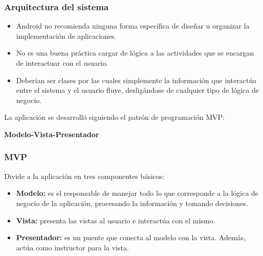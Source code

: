 \begin{frame}[t,fragile]
\frametitle {Arquitectura del sistema}
\begin{itemize}
	\item Android no recomienda ninguna forma específica de diseñar u organizar la implementación de aplicaciones.
	\item No es una buena práctica cargar de lógica a las actividades que se encargan de interactuar	con el usuario.
	\item Deberían ser clases por las cuales simplemente la información que interactúa entre el sistema y el usuario fluye, desligándose de cualquier tipo de lógica de negocio.
\end{itemize}

\vspace{5mm}

La aplicación se desarrolló siguiendo el patrón de programación MVP: 

\begin{center}
	\textbf{Modelo-Vista-Presentador}
\end{center} 

\end{frame}	
\begin{frame}[t,fragile]
\frametitle {MVP}

Divide a la aplicación en tres componentes básicos:

\begin{itemize}
	\item \textbf{Modelo:} es el responsable de manejar todo lo que corresponde a la lógica de negocio de la aplicación, procesando la información y tomando decisiones.
	\vspace{3mm}
	\item \textbf{Vista:} presenta las vistas al usuario e interactúa con el mismo.
	\vspace{3mm}
	\item \textbf{Presentador:} es un puente que conecta al modelo con la vista. Además, actúa como instructor para la vista.
\end{itemize}

\end{frame}	
